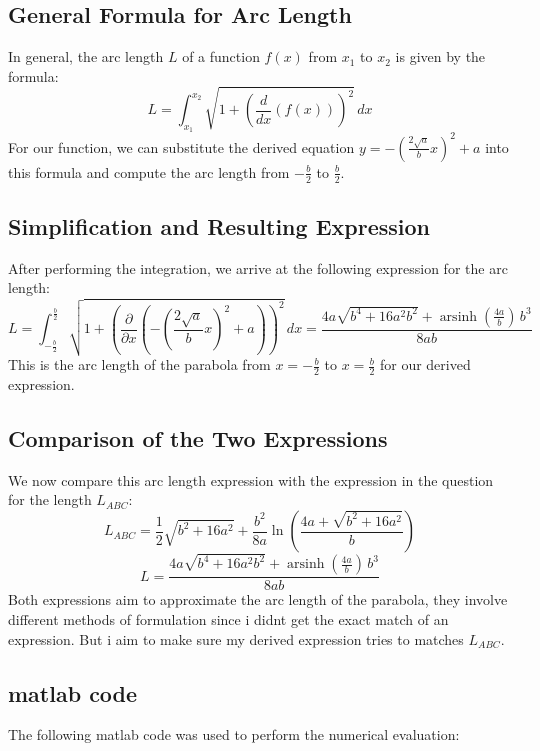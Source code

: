 \documentclass[a4paper, 12pt]{report}
\def\link{blue!50!black}
\begin{document}
    \subsection{General Formula for Arc Length}
    In general, the arc length $L$ of a function $f(x)$ from $x_1$ to $x_2$ is given by the formula:
    \[
    L = \int_{x_1}^{x_2} \sqrt{1 + \left( \frac{d}{dx}(f(x)) \right)^2} \, dx
    \]
    For our function, we can substitute the derived equation $y = -\left(\frac{2\sqrt{a}}{b}x\right)^2 + a$ into this formula and compute the arc length from $-\frac{b}{2}$ to $\frac{b}{2}$.
    
    \subsection{Simplification and Resulting Expression}
    After performing the integration, we arrive at the following expression for the arc length:
    \[
    L = \int_{-\frac{b}{2}}^{\frac{b}{2}} \sqrt{1 + \left(\frac{\partial}{\partial x}\left(-\left(\frac{2\sqrt{a}}{b}x\right)^2 + a\right)\right)^2} \, dx = \frac{4a \sqrt{b^{4} + 16a^{2} b^{2}} + \operatorname{arsinh}\left(\frac{4a}{b}\right) \, b^{3}}{8ab}
    \]
    This is the arc length of the parabola from $x = -\frac{b}{2}$ to $x = \frac{b}{2}$ for our derived expression.
    
    \subsection{Comparison of the Two Expressions}
    We now compare this arc length expression with the expression in the question for the length $L_{ABC}$:
    \[L_{ABC} = \frac{1}{2}\sqrt{b^2 + 16a^2} + \frac{b^2}{8a}\ln\left(\frac{4a + \sqrt{b^2 + 16a^2}}{b}\right)\]
    \[L = \frac{4a \sqrt{b^{4} + 16a^{2} b^{2}} + \operatorname{arsinh}\left(\frac{4a}{b}\right) \, b^{3}}{8ab}\]
    Both expressions aim to approximate the arc length of the parabola, they involve different methods of formulation since i didnt get the exact match of an expression. But i aim to make sure my derived expression tries to matches $L_{ABC}$.
        
    \subsection{matlab code}
    The following matlab code was used to perform the numerical evaluation:
 
    
    
\end{document}
